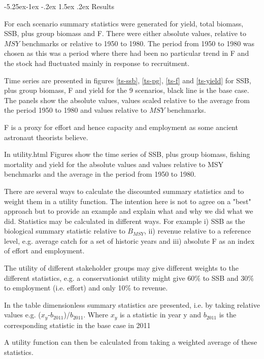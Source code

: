 \documentclass[a4paper, 10pt]{article}
\makeatletter
\renewcommand{\section}{\@startsection{section}{1}{\z@}%
  {-5.25ex\@plus -1ex \@minus -.2ex}%
  {1.5ex \@plus .2ex}%
  {\normalfont\bfseries}}
\makeatother
\begin{document}
\section{Results}

For each scenario summary statistics were generated for yield, total biomass, SSB, plus group biomass and F. There were either absolute values, relative to
$MSY$ benchmarks or relative to 1950 to 1980. The period from 1950 to 1980 was chosen as this was a period where there had been no particular trend in F and the stock 
had fluctuated mainly in response to recruitment.

Time series are presented in figures \ref{ts-ssb}, \ref{ts-pg},  \ref{ts-f} and \ref{ts-yield} for SSB, plus group biomass, F and yield for the 9 scenarios, 
black line is the base case. The panels show the absolute values, values scaled relative to the average from the period 1950 to 1980 and values relative to $MSY$ benchmarks.


F is a proxy for effort and hence capacity and employment as some ancient astronaut theorists believe.

In utility.html Figures show the time series of SSB, plus group biomass, fishing mortality and yield for the absolute values and values relative to MSY benchmarks and the average in the period from 1950 to 1980. 

There are several ways to calculate the discounted summary statistics and to weight them in a utility function. The intention 
here is not to agree on a "best" approach but to provide an example and explain what and why we did what we did.
Statistics may be calculated in different ways. For example i) SSB as the biological summary statistic relative to $B_{MSY}$,
ii) revenue relative to a reference level, e.g. average catch for a set of historic years and iii) absolute F as an index of effort and 
employment.

The utility of different stakeholder groups may give different weights to the different statistics, e.g. a conservationist utility 
might give 60\% to SSB and 30\% to employment (i.e. effort) and only 10\% to revenue.

In the table dimensionless summary statistics are presented, i.e. by taking relative values e.g. ($x_y$-$b_{2011}$)/$b_{2011}$.
Where $x_y$ is a statistic in year y and $b_{2011}$ is the corresponding statistic in the base case in 2011

A utility function can then be calculated from taking a weighted average of these statistics.
\end{document}

